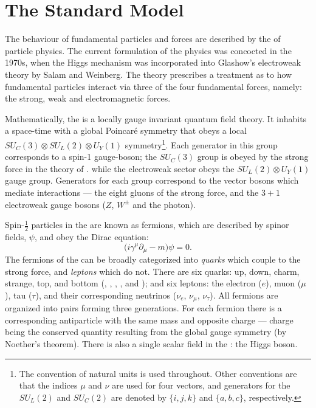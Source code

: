 \section{The Standard Model}
\label{sec:sm}
The behaviour of fundamental particles and forces are described by the \sm of
particle physics.
The current formulation of the \sm physics was concocted in the 1970s, when the Higgs
mechanism was incorporated into Glashow's electroweak theory by Salam and Weinberg.
The theory prescribes a treatment
as to how fundamental particles interact via three of the four
fundamental forces, namely: the strong, weak and electromagnetic forces.

Mathematically, the \sm is a locally gauge invariant quantum field theory.
It inhabits a space-time with a global Poincar\'e symmetry that obeys a local
$SU_C(3)\otimes SU_L(2)\otimes U_Y(1)$ symmetry\footnote{
The convention of natural units is used throughout.
Other conventions are that the indices $\mu$ and $\nu$ are used for four vectors, and generators
for the $SU_L(2)$ and $SU_C(2)$ are denoted by $\{i,j,k\}$ and $\{a,b,c\}$, respectively.}.
Each generator in this group corresponds to a spin-1 gauge-boson;
the $SU_C(3)$ group is obeyed by the strong force in the theory of \QCD.
while the electroweak sector obeys the $SU_L(2)\otimes U_Y(1)$ gauge group.
Generators for each group correspond to the vector bosons which mediate
interactions --- the eight gluons of the strong force, and the $3+1$ electroweak gauge bosons ($Z$,
$W^\pm$ and the photon).

Spin-$\tfrac12$ particles in the \sm are known as fermions,
which are described by spinor fields, $\psi$, and obey the Dirac equation:
\begin{equation}
  \big(i\gamma^\mu\partial_\mu - m\big)\psi = 0.
  \label{th:eq:dirac}
\end{equation}
The fermions of the \sm can be broadly categorized into \emph{quarks} which couple to the strong
force, and \emph{leptons} which do not.
There are six quarks: up, down, charm, strange, top, and bottom (\uquark, \dquark, \cquark,
\squark, \tquark and \bquark); and six leptons: the electron ($e$), muon ($\mu$), tau ($\tau$), and
their corresponding neutrinos ($\nu_e$, $\nu_\mu$, $\nu_\tau$).
All fermions are organized into pairs forming three generations.
For each fermion there is a corresponding antiparticle with the same mass and opposite charge ---
charge being the conserved quantity resulting from the global gauge symmetry (by Noether's
theorem).
There is also a single scalar field in the \sm: the Higgs boson.

